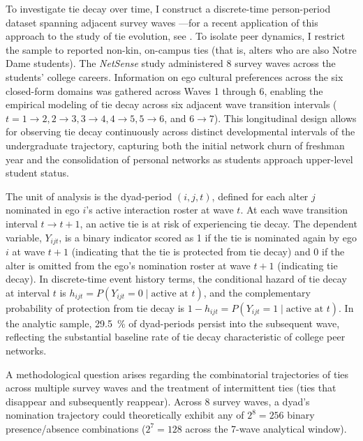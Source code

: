 \documentclass[12pt,letterpaper]{article}
\def\percent{\%}%
\begin{document}
To investigate tie decay over time, I construct a discrete-time person-period dataset spanning adjacent survey waves \citep{allison1982, singer1993s}---for a recent application of this approach to the study of tie evolution, see \citet{kim2024networking-a1c}. To isolate peer dynamics, I restrict the sample to reported non-kin, on-campus ties (that is, alters who are also Notre Dame students). The \textit{NetSense} study administered 8 survey waves across the students' college careers. Information on ego cultural preferences across the six closed-form domains was gathered across Waves 1 through 6, enabling the empirical modeling of tie decay across six adjacent wave transition intervals ($t = 1 \to 2, 2 \to 3, 3 \to 4, 4 \to 5, 5 \to 6$, and $6 \to 7$). This longitudinal design allows for observing tie decay continuously across distinct developmental intervals of the undergraduate trajectory, capturing both the initial network churn of freshman year and the consolidation of personal networks as students approach upper-level student status.

The unit of analysis is the dyad-period $(i, j, t)$, defined for each alter $j$ nominated in ego $i$'s active interaction roster at wave $t$. At each wave transition interval $t \to t+1$, an active tie is at risk of experiencing tie decay. The dependent variable, $Y_{ijt}$, is a binary indicator scored as 1 if the tie is nominated again by ego $i$ at wave $t+1$ (indicating that the tie is protected from tie decay) and 0 if the alter is omitted from the ego's nomination roster at wave $t+1$ (indicating tie decay). In discrete-time event history terms, the conditional hazard of tie decay at interval $t$ is $h_{ijt} = P(Y_{ijt} = 0 \mid \text{active at } t)$, and the complementary probability of protection from tie decay is $1 - h_{ijt} = P(Y_{ijt} = 1 \mid \text{active at } t)$. In the analytic sample, \SI{29.5}{\percent} of dyad-periods persist into the subsequent wave, reflecting the substantial baseline rate of tie decay characteristic of college peer networks.

A methodological question arises regarding the combinatorial trajectories of ties across multiple survey waves and the treatment of intermittent ties (ties that disappear and subsequently reappear). Across 8 survey waves, a dyad's nomination trajectory could theoretically exhibit any of $2^8 = 256$ binary presence/absence combinations ($2^7 = 128$ across the 7-wave analytical window). 
\end{document}
